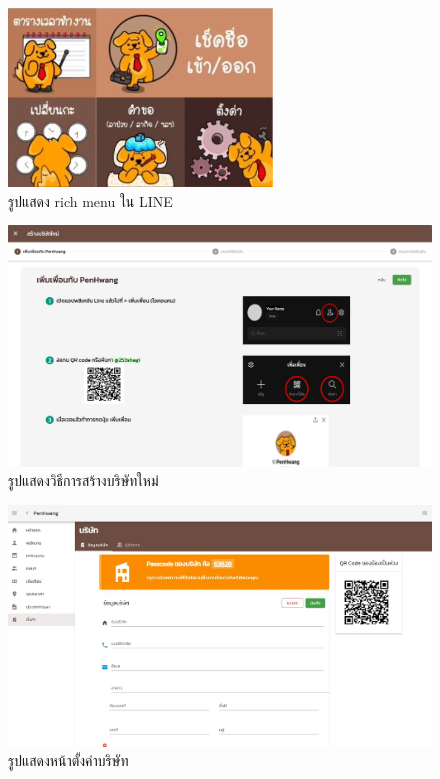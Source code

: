 \begin{figure}
  \begin{center}
    \includegraphics[width=7cm,keepaspectratio]{./images/rich_menu.jpg}
  \end{center}
  \caption[รูปแสดง rich menu ใน LINE]{รูปแสดง rich menu ใน LINE} 
  \label{fig:rich_menu}
\end{figure} 

\begin{figure}
  \begin{center}
    \includegraphics[width=14cm,keepaspectratio]{./images/create_company.jpg}
  \end{center}
  \caption[รูปแสดงวิธีการสร้างบริษัทใหม่]{รูปแสดงวิธีการสร้างบริษัทใหม่} 
  \label{fig:create_company}
\end{figure}

\begin{figure}
  \begin{center}
    \includegraphics[width=14cm,keepaspectratio]{./images/setting.jpg}
  \end{center}
  \caption[รูปแสดงหน้าตั้งค่าบริษัท]{รูปแสดงหน้าตั้งค่าบริษัท} 
  \label{fig:setting}
\end{figure}

